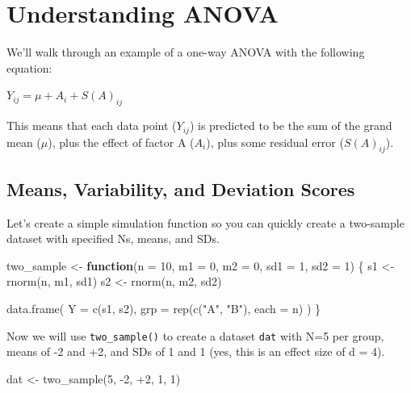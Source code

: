 \documentclass[
  oneside]{book}
\newenvironment{Shaded}{\begin{snugshade}}{\end{snugshade}}
\newcommand{\AttributeTok}[1]{\textcolor[rgb]{0.77,0.63,0.00}{#1}}
\newcommand{\ControlFlowTok}[1]{\textcolor[rgb]{0.13,0.29,0.53}{\textbf{#1}}}
\newcommand{\DecValTok}[1]{\textcolor[rgb]{0.00,0.00,0.81}{#1}}
\newcommand{\FunctionTok}[1]{\textcolor[rgb]{0.00,0.00,0.00}{#1}}
\newcommand{\NormalTok}[1]{#1}
\newcommand{\OtherTok}[1]{\textcolor[rgb]{0.56,0.35,0.01}{#1}}
\newcommand{\SpecialCharTok}[1]{\textcolor[rgb]{0.00,0.00,0.00}{#1}}
\newcommand{\StringTok}[1]{\textcolor[rgb]{0.31,0.60,0.02}{#1}}
\begin{document}
\hypertarget{understanding-anova}{%
\section{Understanding ANOVA}\label{understanding-anova}}

We'll walk through an example of a one-way ANOVA with the following equation:

\(Y_{ij} = \mu + A_i + S(A)_{ij}\)

This means that each data point (\(Y_{ij}\)) is predicted to be the sum of the grand mean (\(\mu\)), plus the effect of factor A (\(A_i\)), plus some residual error (\(S(A)_{ij}\)).

\hypertarget{means-variability-and-deviation-scores}{%
\subsection{Means, Variability, and Deviation Scores}\label{means-variability-and-deviation-scores}}

Let's create a simple simulation function so you can quickly create a two-sample dataset with specified Ns, means, and SDs.

\begin{Shaded}
\begin{Highlighting}[]
\NormalTok{two\_sample }\OtherTok{\textless{}{-}} \ControlFlowTok{function}\NormalTok{(}\AttributeTok{n =} \DecValTok{10}\NormalTok{, }\AttributeTok{m1 =} \DecValTok{0}\NormalTok{, }\AttributeTok{m2 =} \DecValTok{0}\NormalTok{, }\AttributeTok{sd1 =} \DecValTok{1}\NormalTok{, }\AttributeTok{sd2 =} \DecValTok{1}\NormalTok{) \{}
\NormalTok{  s1 }\OtherTok{\textless{}{-}} \FunctionTok{rnorm}\NormalTok{(n, m1, sd1)}
\NormalTok{  s2 }\OtherTok{\textless{}{-}} \FunctionTok{rnorm}\NormalTok{(n, m2, sd2)}
  
  \FunctionTok{data.frame}\NormalTok{(}
    \AttributeTok{Y =} \FunctionTok{c}\NormalTok{(s1, s2),}
    \AttributeTok{grp =} \FunctionTok{rep}\NormalTok{(}\FunctionTok{c}\NormalTok{(}\StringTok{"A"}\NormalTok{, }\StringTok{"B"}\NormalTok{), }\AttributeTok{each =}\NormalTok{ n)}
\NormalTok{  )}
\NormalTok{\}}
\end{Highlighting}
\end{Shaded}

Now we will use \texttt{two\_sample()} to create a dataset \texttt{dat} with N=5 per group, means of -2 and +2, and SDs of 1 and 1 (yes, this is an effect size of d = 4).

\begin{Shaded}
\begin{Highlighting}[]
\NormalTok{dat }\OtherTok{\textless{}{-}} \FunctionTok{two\_sample}\NormalTok{(}\DecValTok{5}\NormalTok{, }\SpecialCharTok{{-}}\DecValTok{2}\NormalTok{, }\SpecialCharTok{+}\DecValTok{2}\NormalTok{, }\DecValTok{1}\NormalTok{, }\DecValTok{1}\NormalTok{)}
\end{Highlighting}
\end{Shaded}
\end{document}
